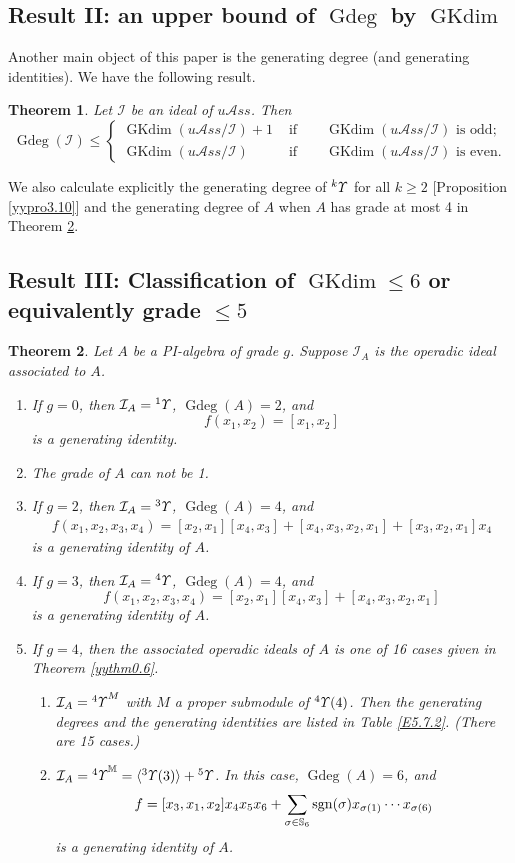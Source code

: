 \documentclass{amsart}
\newtheorem{thm}{Theorem}[section]
\theoremstyle{definition}
\theoremstyle{remark}
\numberwithin{equation}{section}
\def\S{\mathbb{S}}
\def\sgn{{\rm sgn}}
\def\gd{\operatorname{Gdeg}}
\newcommand{\lr}[1]{\langle #1 \rangle}
\newcommand{\up}[1]{{^{#1}{\it \!\Upsilon}}}
\newcommand{\upa}[1]{{^{#1}{\it \!\Upsilon}}}
\def \uas{u\mathcal{A}ss}
\def \I{\mathcal{I}}
\def\gkdim{\operatorname{GKdim}}
\def \S{\mathbb{S}}
\begin{document}
\subsection{Result II: an upper bound of $\gd$ by 
$\gkdim$}
\label{yysec0.7}
Another main object of this paper is the generating degree 
(and generating identities). We have the following result.

\begin{thm}
\label{yythm0.8}
Let $\I$ be an ideal of $\uas$. Then 
$$\gd(\I)\leq \begin{cases}
\gkdim (\uas/\I)+1 & {\text{ if $\quad$ $\gkdim (\uas/\I)$ is odd;}}\\
\gkdim (\uas/\I)  & {\text{ if $\quad$  $\gkdim (\uas/\I)$ is even.}}
\end{cases}
$$
\end{thm}

We also calculate explicitly the generating degree of 
$\up{k}$ for all $k\geq 2$ [Proposition \ref{yypro3.10}]
and the generating degree of $A$ when $A$ has grade at most 4
in Theorem \ref{yythm0.9}.

\subsection{Result III: Classification of $\gkdim\leq 6$
or equivalently grade $\leq 5$}
\label{yysec0.8}

\begin{thm}
\label{yythm0.9}
Let $A$ be a PI-algebra of grade $g$. Suppose  
$\I_A$ is the operadic ideal associated to $A$.
\begin{enumerate}
\item[(1)] 
If $g=0$, then $\I_A=\up{1}$, $\gd(A)=2$, and 
\[f(x_1, x_2)=[x_1, x_2]\]
is a generating identity. 
\item[(2)]	
The grade of $A$ can not be 1.
\item[(3)] 
If $g=2$, then $\I_A=\up{3}$, $\gd(A)=4$, and 
\begin{align*}
	f(x_1, x_2, x_3, x_4)
	=[x_2, x_1][x_4, x_3]+[x_4, x_3, x_2, x_1]+[x_3, x_2, x_1]x_4
\end{align*}
is a generating identity of $A$.
\item[(4)] 
If $g=3$, then $\I_A=\up{4}$, $\gd(A)=4$, and 
\[f(x_1, x_2, x_3, x_4)
=[x_2, x_1][x_4, x_3]+[x_4, x_3, x_2, x_1]\]
is a generating identity of $A$.
\item[(5)] 
If $g=4$, then the associated operadic ideals of $A$ 
is one of 16 cases given in Theorem \ref{yythm0.6}.
\begin{enumerate}
\item[(a)] 
$\I_A=\up{4}^M$ with $M$ a proper submodule of $\up{4}(4)$. 
Then the generating degrees and the generating 
identities are listed in Table \eqref{E5.7.2}. 
{\rm{(}}There are 15 cases.{\rm{)}}
\item[(b)] 
$\I_A=\upa{4}^{\mathbb M}=\lr{\up{3}(3)}+\up{5}$. In this case, 
$\gd(A)=6$, and 
\[f=[x_3, x_1, x_2]x_4x_5x_6+\sum_{\sigma\in \S_6}
\sgn(\sigma)x_{\sigma(1)}\cdots x_{\sigma(6)}\]
is a generating identity of $A$.
\end{enumerate}
\end{enumerate}
\end{thm}
\end{document}
